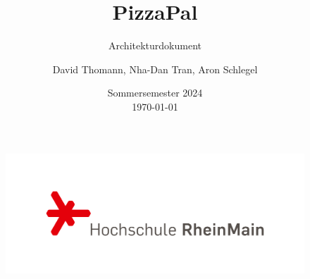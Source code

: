 \documentclass{scrartcl}
\title{PizzaPal}
\subtitle{Architekturdokument}
\author{David Thomann, Nha-Dan Tran, Aron Schlegel}
\date{Sommersemester 2024 \\ \today}
\begin{document}
\maketitle
\thispagestyle{empty}
\begin{figure}[b]
    \centering
    \includegraphics[scale=0.2]{hsrm-logo.png}
\end{figure}
\newpage

\tableofcontents
\newpage










\end{document}
